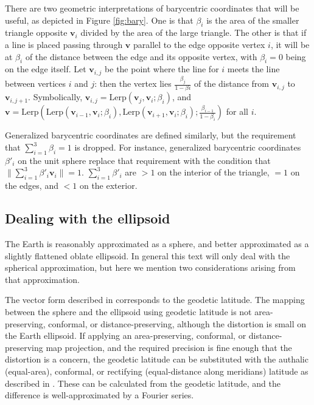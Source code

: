 \documentclass{amsart}[12pt]
\begin{document}
There are two geometric interpretations of barycentric coordinates that will be
useful, as depicted in Figure \ref{fig:bary}. One is that $\beta_i$ is the area
of the smaller triangle opposite $\mathbf v_i$ divided by the area of the large
triangle.
The other is that if a line is placed passing through $\mathbf v$ parallel to
the edge opposite vertex $i$, it will be at $\beta_i$ of the distance between
the edge and its opposite vertex, with $\beta_i = 0$ being on the edge itself.
Let $\mathbf v_{i,j}$ be the point where the line for $i$ meets the line between
vertices $i$ and $j$: then the vertex lies $\frac{\beta_{j}}{1-\beta{i}}$
of the distance from $\mathbf v_{i,j}$ to $\mathbf v_{i,j+1}$. Symbolically,
$\mathbf v_{i,j} = \mathrm{Lerp}(\mathbf v_{j},\mathbf v_i;\beta_{i})$, and
$\mathbf v = \mathrm{Lerp}(\mathrm{Lerp}(\mathbf v_{i-1}, \mathbf v_i;
\beta_{i}), \mathrm{Lerp}(\mathbf v_{i+1}, \mathbf v_i; \beta_{i});
\frac{\beta_{i-1}}{1-\beta_{i}})$ for all $i$.

Generalized barycentric coordinates are defined similarly, but the requirement
that $\sum^3_{i=1} \beta_i = 1$ is dropped. For instance, generalized
barycentric coordinates $\beta'_i$ on the unit sphere replace that requirement
with the condition that $\| \sum^3_{i=1} \beta'_i \mathbf v_i \| = 1$.
$\sum^3_{i=1} \beta'_i$ are $>1$ on the interior of the triangle,
$=1$ on the edges, and $<1$ on the exterior.

\subsection{Dealing with the ellipsoid}
The Earth is reasonably approximated as a sphere, and better approximated as a
slightly flattened oblate ellipsoid. In general this text will only deal with
the spherical approximation, but here we mention two considerations arising
from that approximation.

The vector form described in \cite{gade} corresponds to the geodetic latitude.
The mapping between the sphere and the ellipsoid using geodetic latitude is not
area-preserving, conformal, or distance-preserving, although the distortion is
small on the Earth ellipsoid. If applying an area-preserving, conformal, or
distance-preserving map projection, and the required precision is fine enough
that the distortion is a concern, the geodetic latitude can be substituted
with the authalic (equal-area), conformal, or rectifying
(equal-distance along meridians) latitude as described in \cite{snyder87}.
These can be calculated from the geodetic latitude,
and the difference is well-approximated by a Fourier series.
\end{document}

